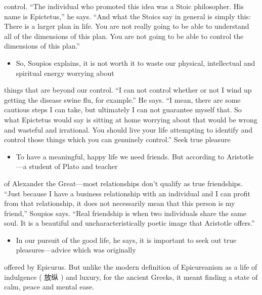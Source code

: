 \documentclass[UTF8,11pt]{ctexart}
\begin{document}
control. “The individual who promoted this idea was a Stoic philosopher. His name is Epictetus,” he says. “And what the Stoics say in general is simply this: There is a larger plan in life. You are not really going to be able to understand all of the dimensions of this plan. You are not going to be able to control the dimensions of this plan.”


\begin{itemize}[leftmargin=2em,itemsep=.2em,topsep=.4em]\item[E.] So, Soupios explains, it is not worth it to waste our physical, intellectual and spiritual energy worrying about
\end{itemize}

things that are beyond our control. “I can not control whether or not I wind up getting the disease swine flu, for example.” He says. “I mean, there are some cautious steps I can take, but ultimately I can not guarantee myself that. So what Epictetus would say is sitting at home worrying about that would be wrong and wasteful and irrational. You should live your life attempting to identify and control those things which you can genuinely control.” Seek true pleasure


\begin{itemize}[leftmargin=2em,itemsep=.2em,topsep=.4em]\item[F.] To have a meaningful, happy life we need friends. But according to Aristotle—a student of Plato and teacher
\end{itemize}

of Alexander the Great—most relationships don’t qualify as true friendships. “Just because I have a business relationship with an individual and I can profit from that relationship, it does not necessarily mean that this person is my friend,” Soupios says. “Real friendship is when two individuals share the same soul. It is a beautiful and uncharacteristically poetic image that Aristotle offers.”


\begin{itemize}[leftmargin=2em,itemsep=.2em,topsep=.4em]\item[G.] In our pursuit of the good life, he says, it is important to seek out true pleasures—advice which was originally
\end{itemize}

offered by Epicurus. But unlike the modern definition of Epicureanism as a life of indulgence ( 放纵 ) and luxury, for the ancient Greeks, it meant finding a state of calm, peace and mental ease.
\end{document}
